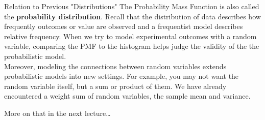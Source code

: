 \documentclass[handout]{beamer}
\newcommand{\nl}[1]{\vspace{#1 em}}
\begin{document}
    \begin{frame}{Relation to Previous "Distributions"}
        The Probability Mass Function is also called the \textbf{probability distribution}. Recall that the distribution of data describes how frequently outcomes or value are observed and a frequentist model describes relative frequency. When we try to model experimental outcomes with  a random variable, comparing the PMF to the histogram helps judge the validity of the the probabilistic model. 
        \\ \nl{0.5}
        Moreover, modeling the connections between random variables extends probabilistic models into new settings. For example, you may not want the random variable itself, but a sum or product of them. We have already encountered a weight sum of random variables, the sample mean and variance.
        \begin{center}
            More on that in the next lecture\ldots
        \end{center}
    \end{frame}
\end{document}
